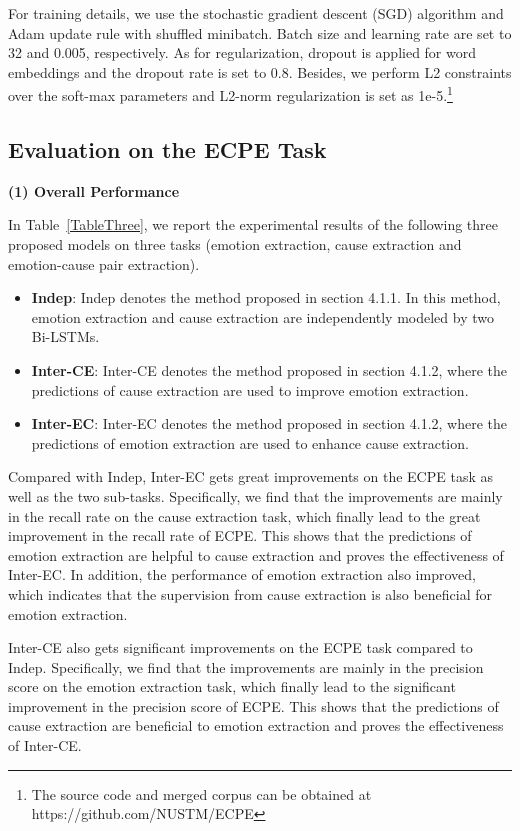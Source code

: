 \documentclass[11pt,a4paper]{article}
\begin{document}
For training details, we use the stochastic gradient descent (SGD) algorithm and Adam update rule with shuffled minibatch. Batch size and learning rate are set to 32 and 0.005, respectively. As for regularization, dropout is applied for word embeddings and the dropout rate is set to 0.8. Besides, we perform L2 constraints over the soft-max parameters and L2-norm regularization is set as 1e-5.\footnote{The source code and merged corpus can be obtained at https://github.com/NUSTM/ECPE}

\subsection{Evaluation on the ECPE Task}


\noindent \textbf{(1) Overall Performance}

In Table~\ref{TableThree}, we report the experimental results of the following three proposed models on three tasks (emotion extraction, cause extraction and emotion-cause pair extraction).


\begin{itemize}
	\item \textbf{Indep}: Indep denotes the method proposed in section 4.1.1. In this method, emotion extraction and cause extraction are independently modeled by two Bi-LSTMs.
	\item \textbf{Inter-CE}: Inter-CE denotes the method proposed in section 4.1.2, where the predictions of cause extraction are used to improve emotion extraction.
	\item \textbf{Inter-EC}: Inter-EC denotes the method proposed in section 4.1.2, where the predictions of emotion extraction are used to enhance cause extraction.
\end{itemize}


Compared with Indep, Inter-EC gets great improvements on the ECPE task as well as the two sub-tasks. Specifically, we find that the improvements are mainly in the recall rate on the cause extraction task, which finally lead to the great improvement in the recall rate of ECPE. This shows that the predictions of emotion extraction are helpful to cause extraction and proves the effectiveness of Inter-EC. In addition, the performance of emotion extraction also improved, which indicates that the supervision from cause extraction is also beneficial for emotion extraction. 

Inter-CE also gets significant improvements on the ECPE task compared to Indep. Specifically, we find that the improvements are mainly in the precision score on the emotion extraction task, which finally lead to the significant improvement in the precision score of ECPE. This shows that the predictions of cause extraction are beneficial to emotion extraction and proves the effectiveness of Inter-CE.  
\end{document}
